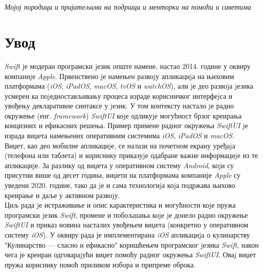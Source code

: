 \documentclass[12pt,oneside]{memoir}
\begin{document}
\frontmatter
\naslovna

\chapter*{}
\thispagestyle{empty}
\begin{flushright}
\Large{\textit{Мојој породици и пријатељима на подршци и менторки на помоћи и саветима}}
\end{flushright}

\komisija
\apstrakt
\tableofcontents*

\mainmatter

\chapter{Увод}

\indent \textit{Swift} jе модеран програмски jезик опште намене, настао 2014. године у оквиру компаниjе \textit{Apple}. Првенствено jе намењен развоjу апликациjа на њиховим платформама (\textit{iOS}, \textit{iPadOS}, \textit{macOS}, \textit{tvOS} и \textit{watchOS}), али jе део развоjа jезика усмерен ка поjедностављивању процеса израде корисничког интерфеjса и увођењу декларативне синтаксе у jезик. У том контексту настало jе радно окружење (енг. \textit{framework}) \textit{SwiftUI} коjе одликуjе могућност брзог креирања концизних и ефикасних решења. Пример примене радног окружења \textit{SwiftUI} jе израда виџета намењених оперативним системима \textit{iOS}, \textit{iPadOS} и \textit{macOS}. 
\\
\indent Виџет, као део мобилне апликациjе, се налази на почетном екрану уређаjа (телефона или таблета) и кориснику приказуjе одабране важне информациjе из те апликациjе. За разлику од виџета у оперативном систему \textit{Android}, коjи су присутни више од десет година, виџети на платформама компаније \textit{Apple} су уведени 2020. године, тако да jе и сама технологиjа коjа подржава њихово креирање и даље у активном развоjу.
\\
\indent Циљ рада jе истраживање и опис карактеристика и могућности коjе пружа програмски jезик \textit{Swift}, промене и побољшања коjе jе донело радно окружење \textit{SwiftUI} и приказ новина насталих увођењем виџета (конкретно у оперативном систему \textit{iOS}). У оквиру рада је имплементирана \textit{iOS} апликациjа о кулинарству "Кулинарство --- сласно и ефикасно" коришћењем програмског jезика \textit{Swift}, након чега је креиран одговараjући виџет помоћу радног окружења \textit{SwiftUI}. Оваj виџет пружа кориснику помоћ приликом избора и припреме оброка.
\end{document}
